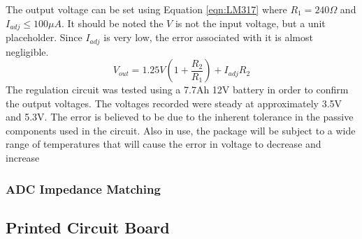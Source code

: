 The output voltage can be set using Equation \ref{eqn:LM317} where $R_1= 240\Omega$ and $I_{adj}\le 100\mu A$.
It should be noted the $V$ is not the input voltage, but a unit placeholder.
Since $I_{adj}$ is very low, the error associated with it is almost negligible. 
\begin{equation}
V_{out} = 1.25V(1+\frac{R_2}{R_1}) + I_{adj}R_2
\label{eqn:LM317}
\end{equation}
The regulation circuit was tested using a 7.7Ah 12V battery in order to confirm the output voltages. %
The voltages recorded were steady at approximately 3.5V and 5.3V.
The error is believed to be due to the inherent tolerance in the passive components used in the circuit.
Also in use, the package will be subject to a wide range of temperatures that will cause the error in voltage to decrease and increase

\subsubsection{ADC Impedance Matching}



\subsection{Printed Circuit Board}